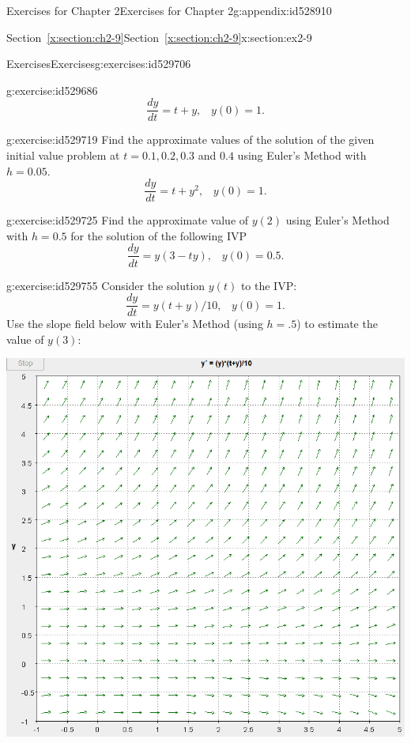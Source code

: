 \documentclass[oneside,10pt,]{book}
\newcommand{\xreffont}{\relax}
\numberwithin{equation}{section}
\numberwithin{equation}{section}
\begin{document}
\begin{appendixptx}{Exercises for Chapter 2}{}{Exercises for Chapter 2}{}{}{g:appendix:id528910}
\begin{sectionptx}{Section~{\xreffont\ref*{x:section:ch2-9}}}{}{Section~{\xreffont\ref*{x:section:ch2-9}}}{}{}{x:section:ex2-9}
\begin{exercises-subsection-numberless}{Exercises}{}{Exercises}{}{}{g:exercises:id529706}
\begin{divisionexercise}{1}{}{}{g:exercise:id529686}
\begin{equation*}
\frac{dy}{dt}=t+y,\,\,\,\,\,y(0)=1.
\end{equation*}
%
\end{divisionexercise}%
\begin{divisionexercise}{2}{}{}{g:exercise:id529719}%
Find the approximate values of the solution of the given initial value problem at \(t=0.1,0.2,0.3\) and \(0.4\) using Euler's Method with \(h=0.05\).%
\begin{equation*}
\frac{dy}{dt}=t+y^{2},\,\,\,\,\,y(0)=1.
\end{equation*}
%
\end{divisionexercise}%
\begin{divisionexercise}{3}{}{}{g:exercise:id529725}%
Find the approximate value of \(y\left(2\right)\) using Euler's Method with \(h=0.5\) for the solution of the following IVP%
\begin{equation*}
\frac{dy}{dt}=y\left(3-ty\right),\,\,\,\,\,y(0)=0.5.
\end{equation*}
%
\end{divisionexercise}%
\begin{divisionexercise}{4}{}{}{g:exercise:id529755}%
Consider the solution \(y(t)\) to the IVP:%
\begin{equation*}
\frac{dy}{dt}=y\left(t+y\right)/10,\,\,\,\,\,y(0)=1.
\end{equation*}
Use the slope field below with Euler's Method (using \(h=.5\)) to estimate the value of \(y(3)\): \begin{image}{0}{1}{0}%
\includegraphics[width=\linewidth]{images/2.9-4.png}

\end{image}
\end{divisionexercise}
\end{exercises-subsection-numberless}
\end{sectionptx}
\end{appendixptx}
\end{document}
